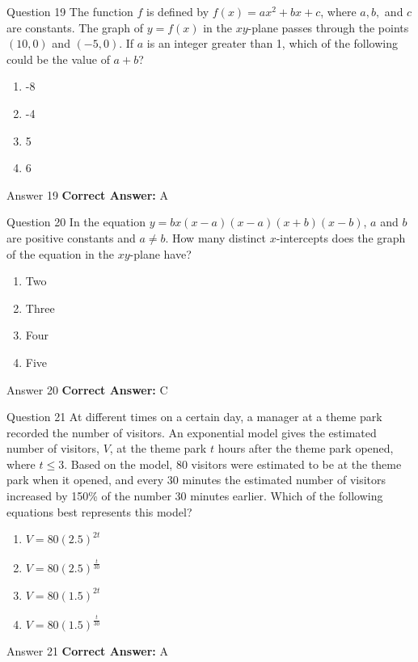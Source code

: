 \documentclass{beamer}
\begin{document}
\begin{frame}{Question 19}
\small
The function \( f \) is defined by \( f(x) = ax^2 + bx + c \), where \( a, b, \) and \( c \) are constants. The graph of \( y = f(x) \) in the \( xy \)-plane passes through the points \( (10, 0) \) and \( (-5, 0) \).  
If \( a \) is an integer greater than 1, which of the following could be the value of \( a + b \)?
\vspace{0.35cm}
\begin{enumerate}
    \item[A.] -8
    \item[B.] -4
    \item[C.] 5
    \item[D.] 6
\end{enumerate}
\end{frame}
\begin{frame}{Answer 19}
\small
\textbf{Correct Answer:} A
\end{frame}

\begin{frame}{Question 20}
\small
In the equation \( y = bx(x - a)(x - a)(x + b)(x - b) \),  
\( a \) and \( b \) are positive constants and \( a \ne b \).  
How many distinct \( x \)-intercepts does the graph of the equation in the \( xy \)-plane have?
\vspace{0.35cm}
\begin{enumerate}
    \item[A.] Two
    \item[B.] Three
    \item[C.] Four
    \item[D.] Five
\end{enumerate}
\end{frame}
\begin{frame}{Answer 20}
\small
\textbf{Correct Answer:} C
\end{frame}

\begin{frame}{Question 21}
\small
At different times on a certain day, a manager at a theme park recorded the number of visitors.  
An exponential model gives the estimated number of visitors, $V$, at the theme park $t$ hours after the theme park opened, where $t \leq 3$.  
Based on the model, 80 visitors were estimated to be at the theme park when it opened,  
and every 30 minutes the estimated number of visitors increased by 150\% of the number 30 minutes earlier.  
Which of the following equations best represents this model?
\vspace{0.35cm}
\begin{enumerate}
    \item[A.] $V = 80(2.5)^{2t}$
    \item[B.] $V = 80(2.5)^{\frac{t}{30}}$
    \item[C.] $V = 80(1.5)^{2t}$
    \item[D.] $V = 80(1.5)^{\frac{t}{30}}$
\end{enumerate}
\end{frame}
\begin{frame}{Answer 21}
\small
\textbf{Correct Answer:} A
\end{frame}
\end{document}
